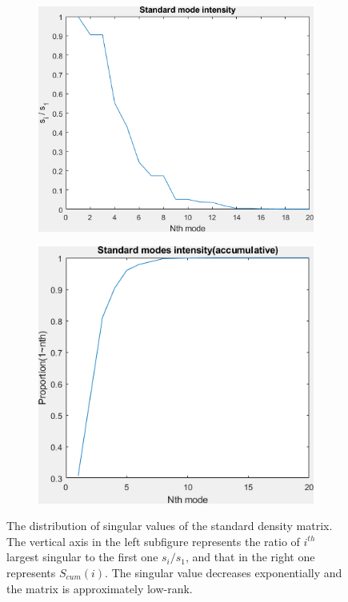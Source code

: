 \documentclass{article}
\numberwithin{equation}{section}
\begin{document}
 \begin{figure}
 \begin{subfigure}{.5\textwidth}
   \centering
   \includegraphics[width=0.9\linewidth]{../figures/singular.png}  
   \label{fig:singular}
 \end{subfigure}
 \begin{subfigure}{.5\textwidth}
   \centering
   \includegraphics[width=.8\linewidth]{../figures/singular_accumative.png}  
   \label{fig:singular_acc}
 \end{subfigure}
 \caption{The distribution of singular values of the standard density matrix. The vertical axis in the left subfigure represents the ratio of $i^{th}$ largest singular to the first one $s_i/s_1$, and that in the right one represents $S_{cum}(i)$. The singular value decreases exponentially and the matrix is approximately low-rank. }
 \label{fig:standard singular}
 \end{figure}
 
\end{document}
